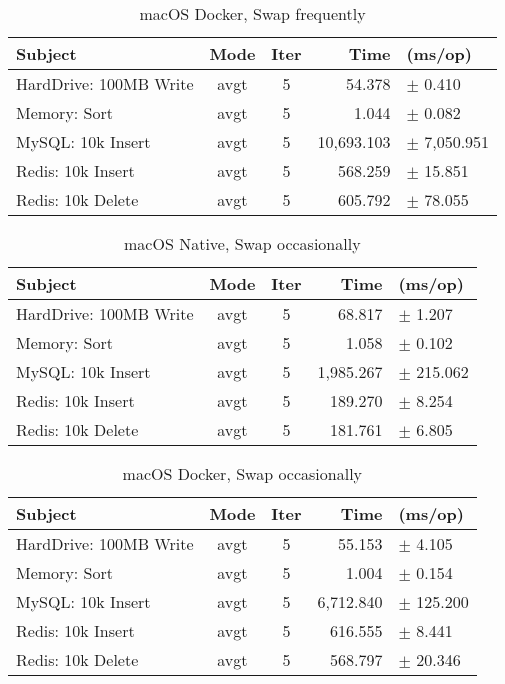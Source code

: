 \documentclass{IEEEtran}
\begin{document}
\begin{table*}
    \centering
    \label{tab:macos-docker-swap}
    \caption{macOS Docker, Swap frequently}
    \begin{tabular}{l c c r l}
        \hline
        \textbf{Subject} & \textbf{Mode} & \textbf{Iter} & \textbf{Time} & \textbf{(ms/op)} \\
        \hline
        HardDrive: 100MB Write & avgt & 5 & 54.378 &$\pm$ 0.410 \\
        Memory: Sort      & avgt & 5 & 1.044 &$\pm$ 0.082 \\
        MySQL: 10k Insert & avgt & 5 & 10,693.103 &$\pm$ 7,050.951 \\
        Redis: 10k Insert & avgt & 5 & 568.259 &$\pm$ 15.851 \\
        Redis: 10k Delete & avgt & 5 & 605.792 &$\pm$ 78.055 \\
    \end{tabular}
\end{table*}

\begin{table*}
    \centering
    \label{tab:macos-native}
    \caption{macOS Native, Swap occasionally}
    \begin{tabular}{l c c r l}
        \hline
        \textbf{Subject} & \textbf{Mode} & \textbf{Iter} & \textbf{Time} & \textbf{(ms/op)} \\
        \hline
        HardDrive: 100MB Write & avgt & 5 & 68.817 &$\pm$ 1.207 \\
        Memory: Sort      & avgt & 5 & 1.058 &$\pm$ 0.102 \\
        MySQL: 10k Insert & avgt & 5 & 1,985.267 &$\pm$ 215.062 \\
        Redis: 10k Insert & avgt & 5 & 189.270 &$\pm$ 8.254 \\
        Redis: 10k Delete & avgt & 5 & 181.761 &$\pm$ 6.805 \\
    \end{tabular}
\end{table*}

\begin{table*}
    \centering
    \label{tab:macos-docker}
    \caption{macOS Docker, Swap occasionally}
    \begin{tabular}{l c c r l}
        \hline
        \textbf{Subject} & \textbf{Mode} & \textbf{Iter} & \textbf{Time} & \textbf{(ms/op)} \\
        \hline
        HardDrive: 100MB Write & avgt & 5 & 55.153 &$\pm$ 4.105 \\
        Memory: Sort      & avgt & 5 & 1.004 &$\pm$ 0.154 \\
        MySQL: 10k Insert & avgt & 5 & 6,712.840 &$\pm$ 125.200 \\
        Redis: 10k Insert & avgt & 5 & 616.555 &$\pm$ 8.441 \\
        Redis: 10k Delete & avgt & 5 & 568.797 &$\pm$ 20.346 \\
    \end{tabular}
\end{table*}
\end{document}
